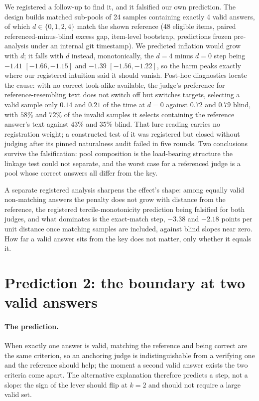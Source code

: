 \documentclass[11pt]{article}
\begin{document}
We registered a follow-up to find it, and it falsified our own prediction.
The design builds matched sub-pools of 24 samples containing exactly 4 valid answers, of which $d \in \{0,1,2,4\}$ match the shown reference (48 eligible items, paired referenced-minus-blind excess gap, item-level bootstrap, predictions frozen pre-analysis under an internal git timestamp).
We predicted inflation would grow with $d$; it falls with $d$ instead, monotonically, the $d{=}4$ minus $d{=}0$ step being $-1.41$ $[-1.66, -1.15]$ and $-1.39$ $[-1.56, -1.22]$, so the harm peaks exactly where our registered intuition said it should vanish.
Post-hoc diagnostics locate the cause: with no correct look-alike available, the judge's preference for reference-resembling text does not switch off but switches targets, selecting a valid sample only $0.14$ and $0.21$ of the time at $d{=}0$ against $0.72$ and $0.79$ blind, with $58\%$ and $72\%$ of the invalid samples it selects containing the reference answer's text against $43\%$ and $35\%$ blind.
That lure reading carries no registration weight; a constructed test of it was registered but closed without judging after its pinned naturalness audit failed in five rounds.
Two conclusions survive the falsification: pool composition is the load-bearing structure the linkage test could not separate, and the worst case for a referenced judge is a pool whose correct answers all differ from the key.

A separate registered analysis sharpens the effect's shape: among equally valid non-matching answers the penalty does not grow with distance from the reference, the registered tercile-monotonicity prediction being falsified for both judges, and what dominates is the exact-match step, $-3.38$ and $-2.18$ points per unit distance once matching samples are included, against blind slopes near zero.
How far a valid answer sits from the key does not matter, only whether it equals it.

\section{Prediction 2: the boundary at two valid answers}
\label{sec:p2}

\paragraph{The prediction.}
When exactly one answer is valid, matching the reference and being correct are the same criterion, so an anchoring judge is indistinguishable from a verifying one and the reference should help; the moment a second valid answer exists the two criteria come apart.
The alternative explanation therefore predicts a step, not a slope: the sign of the lever should flip at $k{=}2$ and should not require a large valid set.
\end{document}
